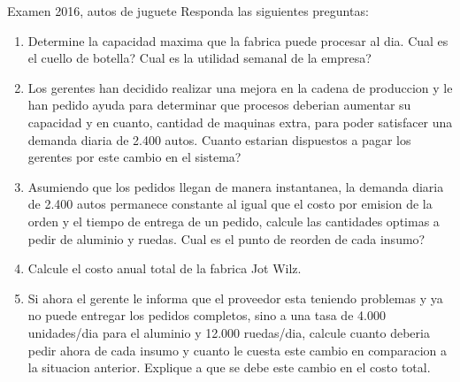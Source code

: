 \begin{enunciado}{Examen 2016, autos de juguete}
Responda las siguientes preguntas:
\begin{enumerate}[label=\alph*.]
  \item Determine la capacidad maxima que la fabrica puede procesar al dia. Cual es el cuello de botella? Cual es la utilidad semanal de la empresa?
  \item Los gerentes han decidido realizar una mejora en la cadena de produccion y le han pedido ayuda para determinar que procesos deberian aumentar su capacidad y en cuanto, cantidad de maquinas extra, para poder satisfacer una demanda diaria de 2.400 autos. Cuanto estarian dispuestos a pagar los gerentes por este cambio en el sistema?
  \item Asumiendo que los pedidos llegan de manera instantanea, la demanda diaria de 2.400 autos permanece constante al igual que el costo por emision de la orden y el tiempo de entrega de un pedido, calcule las cantidades optimas a pedir de aluminio y ruedas. Cual es el punto de reorden de cada insumo?
  \item Calcule el costo anual total de la fabrica Jot Wilz.
  \item Si ahora el gerente le informa que el proveedor esta teniendo problemas y ya no puede entregar los pedidos completos, sino a una tasa de 4.000 unidades/dia para el aluminio y 12.000 ruedas/dia, calcule cuanto deberia pedir ahora de cada insumo y cuanto le cuesta este cambio en comparacion a la situacion anterior. Explique a que se debe este cambio en el costo total.
\end{enumerate}
\end{enunciado}

